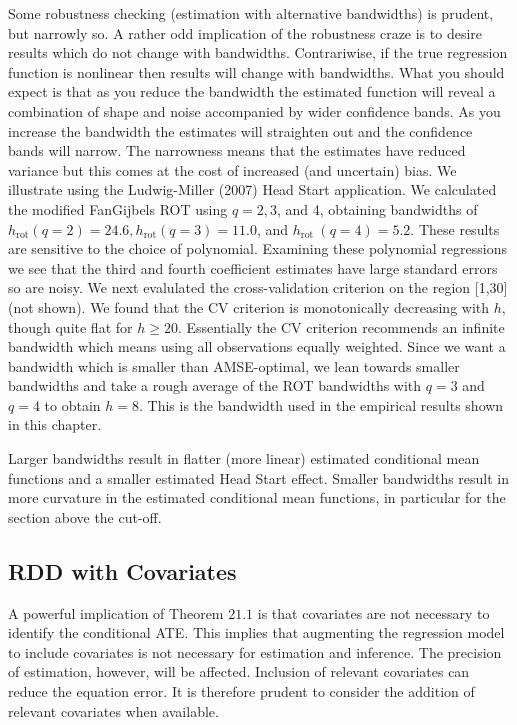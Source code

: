 \documentclass[10pt]{article}
\begin{document}
Some robustness checking (estimation with alternative bandwidths) is prudent, but narrowly so. A rather odd implication of the robustness craze is to desire results which do not change with bandwidths. Contrariwise, if the true regression function is nonlinear then results will change with bandwidths. What you should expect is that as you reduce the bandwidth the estimated function will reveal a combination of shape and noise accompanied by wider confidence bands. As you increase the bandwidth the estimates will straighten out and the confidence bands will narrow. The narrowness means that the estimates have reduced variance but this comes at the cost of increased (and uncertain) bias. We illustrate using the Ludwig-Miller (2007) Head Start application. We calculated the modified FanGijbels ROT using $q=2,3$, and 4, obtaining bandwidths of $h_{\mathrm{rot}}(q=2)=24.6, h_{\mathrm{rot}}(q=3)=11.0$, and $h_{\text {rot }}(q=4)=5.2$. These results are sensitive to the choice of polynomial. Examining these polynomial regressions we see that the third and fourth coefficient estimates have large standard errors so are noisy. We next evalulated the cross-validation criterion on the region [1,30] (not shown). We found that the CV criterion is monotonically decreasing with $h$, though quite flat for $h \geq 20$. Essentially the CV criterion recommends an infinite bandwidth which means using all observations equally weighted. Since we want a bandwidth which is smaller than AMSE-optimal, we lean towards smaller bandwidths and take a rough average of the ROT bandwidths with $q=3$ and $q=4$ to obtain $h=8$. This is the bandwidth used in the empirical results shown in this chapter.

Larger bandwidths result in flatter (more linear) estimated conditional mean functions and a smaller estimated Head Start effect. Smaller bandwidths result in more curvature in the estimated conditional mean functions, in particular for the section above the cut-off.

\subsection{RDD with Covariates}
A powerful implication of Theorem $21.1$ is that covariates are not necessary to identify the conditional ATE. This implies that augmenting the regression model to include covariates is not necessary for estimation and inference. The precision of estimation, however, will be affected. Inclusion of relevant covariates can reduce the equation error. It is therefore prudent to consider the addition of relevant covariates when available.
\end{document}
